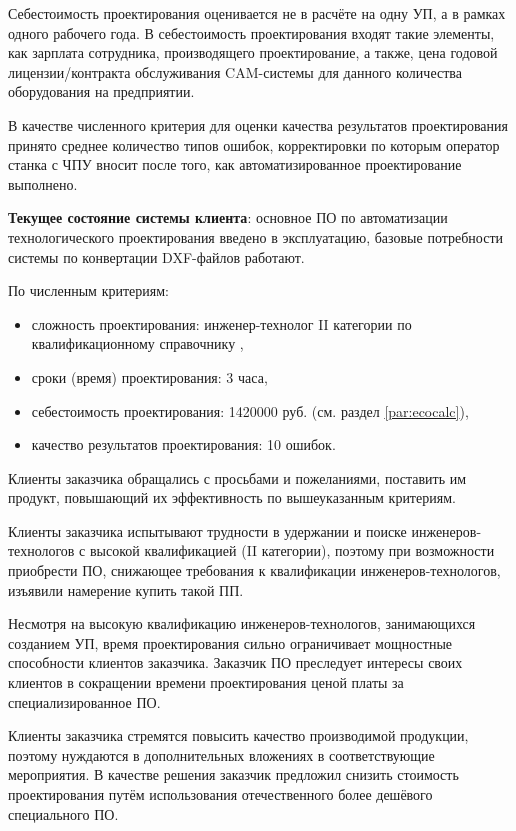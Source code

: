 Себестоимость проектирования оценивается не в расчёте на одну УП, а в рамках одного рабочего года. В себестоимость проектирования входят такие элементы, как зарплата сотрудника, производящего проектирование, а также, цена годовой лицензии/контракта обслуживания CAM-системы для данного количества оборудования на предприятии.

В качестве численного критерия для оценки качества результатов проектирования принято среднее количество типов ошибок, корректировки по которым оператор станка с ЧПУ вносит после того, как автоматизированное проектирование выполнено.

\textbf{Текущее состояние системы клиента}: основное ПО по автоматизации технологического проектирования введено в эксплуатацию, базовые потребности системы по конвертации DXF-файлов работают.

По численным критериям:
\begin{itemize}
	\item сложность проектирования: инженер-технолог II категории по квалификационному справочнику \cite{qualification},
	\item сроки (время) проектирования: 3 часа,
	\item себестоимость проектирования: 1420000 руб. (см. раздел \ref{par:ecocalc}),
	\item качество результатов проектирования: 10 ошибок.
\end{itemize}

Клиенты заказчика обращались с просьбами и пожеланиями, поставить им продукт, повышающий их эффективность по вышеуказанным критериям.

Клиенты заказчика испытывают трудности в удержании и поиске инженеров-технологов с высокой квалификацией (II категории), поэтому при возможности приобрести ПО, снижающее требования к квалификации инженеров-технологов, изъявили намерение купить такой ПП.

Несмотря на высокую квалификацию инженеров-технологов, занимающихся созданием УП, время проектирования сильно ограничивает мощностные способности клиентов заказчика. Заказчик ПО преследует интересы своих клиентов в сокращении времени проектирования ценой платы за специализированное ПО.

Клиенты заказчика стремятся повысить качество производимой продукции, поэтому нуждаются в дополнительных вложениях в соответствующие мероприятия. В качестве решения заказчик предложил снизить стоимость проектирования путём использования отечественного более дешёвого специального ПО.

